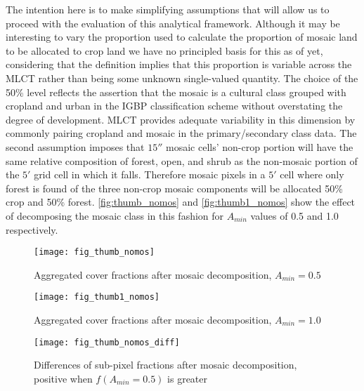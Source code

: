 The intention here is to make simplifying assumptions that will allow
us to proceed with the evaluation of this analytical framework.
Although it may be interesting to vary the proportion used to
calculate the proportion of mosaic land to be allocated to crop land
we have no principled basis for this as of yet, considering that the
definition implies that this proportion is variable across the MLCT
rather than being some unknown single-valued quantity.  The choice of
the 50\% level reflects the assertion that the mosaic is a cultural
class grouped with cropland and urban in the IGBP classification
scheme without overstating the degree of development.  MLCT provides
adequate variability in this dimension by commonly pairing cropland
and mosaic in the primary/secondary class data.  The second assumption
imposes that $15''$ mosaic cells' non-crop portion will have the same
relative composition of forest, open, and shrub as the non-mosaic
portion of the $5'$ grid cell in which it falls. Therefore mosaic
pixels in a $5'$ cell where only forest is found of the three non-crop
mosaic components will be allocated 50\% crop and 50\% forest.
\autoref{fig:thumb_nomos} and \autoref{fig:thumb1_nomos} show the
effect of decomposing the mosaic class in this fashion for $A_{min}$
values of 0.5 and 1.0 respectively.



\begin{figure}[htp]
\centering
  


\texttt{[image: fig\_thumb\_nomos]}
 
\caption{Aggregated cover fractions after mosaic decomposition, $A_{min}=0.5$}
\label{fig:thumb_nomos}
\end{figure} 

\begin{figure}[htp]
\centering
  


\texttt{[image: fig\_thumb1\_nomos]}
 
\caption{Aggregated cover fractions after mosaic decomposition, $A_{min}=1.0$}
\label{fig:thumb1_nomos}
\end{figure} 



\begin{figure}[htp]
\centering
  

\texttt{[image: fig\_thumb\_nomos\_diff]}
 
\caption{Differences of sub-pixel fractions after mosaic
  decomposition, positive when $f(A_{min} = 0.5)$ is greater}
\label{fig:thumb_nomos_diff}
\end{figure} 





